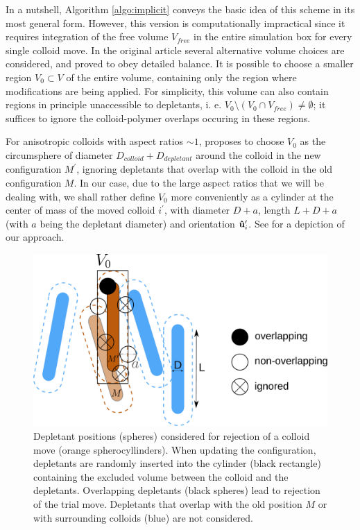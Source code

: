 In a nutshell, Algorithm \ref{algo:implicit} conveys the basic idea of this scheme in its most general form. However, this version is computationally impractical since it requires integration of the free volume $V_{free}$ in the entire simulation box for every single colloid move. In the original article \cite{glaser2015parallel} several alternative volume choices are considered, and proved to obey detailed balance. It is possible to choose a smaller region $V_0 \subset V$ of the entire volume, containing only the region where modifications are being applied. For simplicity, this volume can also contain regions in principle unaccessible to depletants, i. e. $V_0 \setminus (V_0 \cap V_{free}) \neq \emptyset$; it suffices to ignore the colloid-polymer overlaps occuring in these regions.

For anisotropic colloids with aspect ratios $\sim 1$, \cite{glaser2015parallel} proposes to choose $V_0$ as the circumsphere of diameter $D_{colloid} + D_{depletant}$ around the colloid in the new configuration $M^\prime$, ignoring depletants that overlap with the colloid in the old configuration $M$. In our case, due to the large aspect ratios that we will be dealing with, we shall rather define $V_0$ more conveniently as a cylinder at the center of mass of the moved colloid $i^\prime$, with diameter $D + a$, length $L + D + a$ (with $a$ being the depletant diameter) and orientation ${\bf \hat{u}}_i^\prime$. See  for a depiction of our approach.

\begin{figure}
\begin{center}
\includegraphics[width= .8\columnwidth]{figures/chapter-1/implicit_depletants}
\caption{ \label{implicit} Depletant positions (spheres) considered for rejection of a colloid move (orange spherocyllinders). When updating the configuration, depletants are randomly inserted into the cylinder (black rectangle) containing the excluded volume between the colloid and the depletants. Overlapping depletants (black spheres) lead to rejection of the trial move. Depletants that overlap with the old position $M$ or with surrounding colloids (blue) are not considered.}
\end{center}
\end{figure}

\clearpage